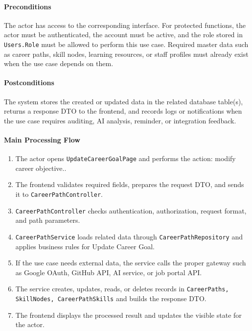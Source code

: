 \paragraph{Preconditions}

The actor has access to the corresponding interface. For protected functions, the actor must be authenticated, the account must be active, and the role stored in \texttt{Users.Role} must be allowed to perform this use case. Required master data such as career paths, skill nodes, learning resources, or staff profiles must already exist when the use case depends on them.

\paragraph{Postconditions}

The system stores the created or updated data in the related database table(s), returns a response DTO to the frontend, and records logs or notifications when the use case requires auditing, AI analysis, reminder, or integration feedback.

\paragraph{Main Processing Flow}

\begin{enumerate}
    \item The actor opens \texttt{UpdateCareerGoalPage} and performs the action: modify career objective..
    \item The frontend validates required fields, prepares the request DTO, and sends it to \texttt{CareerPathController}.
    \item \texttt{CareerPathController} checks authentication, authorization, request format, and path parameters.
    \item \texttt{CareerPathService} loads related data through \texttt{CareerPathRepository} and applies business rules for Update Career Goal.
    \item If the use case needs external data, the service calls the proper gateway such as Google OAuth, GitHub API, AI service, or job portal API.
    \item The service creates, updates, reads, or deletes records in \texttt{CareerPaths, SkillNodes, CareerPathSkills} and builds the response DTO.
    \item The frontend displays the processed result and updates the visible state for the actor.
\end{enumerate}

